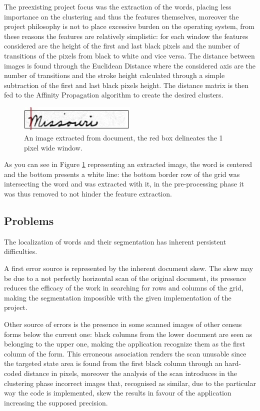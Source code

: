The preexisting project focus was the extraction of the words, placing less importance on the clustering and thus the features themselves, moreover the project philosophy is not to place excessive burden on the operating system, from these reasons  the features are relatively simplistic: for each window the features considered are the height of the first and last black pixels and the number of transitions of the pixels from black to white and vice versa.
The distance between images is found through the Euclidean Distance where the considered axis are the number of transitions and the stroke height calculated through a simple subtraction of the first and last black pixels height.
The distance matrix is then fed to the Affinity Propagation algorithm to create the desired clusters.

\begin{figure}[!ht]
\centering
\vspace{0.3cm}
\includegraphics[width=0.5\textwidth]{images/missouri_1pix.jpg}
\caption{An image extracted from document, the red box delineates the 1 pixel wide window.}
\label{fig:extracted_image}
\end{figure}

As you can see in Figure \ref{fig:extracted_image} representing an extracted image, the word is centered and the bottom presents a white line: the bottom border row of the grid was intersecting the word and was extracted with it, in the pre-processing phase it was thus removed to not hinder the feature extraction.

\subsection{Problems}

The localization of words and their segmentation has inherent persistent difficulties.

A first error source is represented by the inherent document skew. The skew may be due to a not perfectly horizontal scan of the original document, its presence reduces the efficacy of the work in searching for rows and columns of the grid, making the segmentation impossible with the given implementation of the project.

Other source of errors is the presence in some scanned images of other census forms below the current one: black columns from the lower document are seen as belonging to the upper one, making the application recognize them as the first column of the form.
This erroneous association renders the scan unusable since the targeted state area is found from the first black column through an hard-coded distance in pixels, moreover the analysis of the scan introduces in the clustering phase incorrect images that, recognised as similar, due to the particular way the code is implemented, skew the results in favour of the application increasing the supposed precision. 

